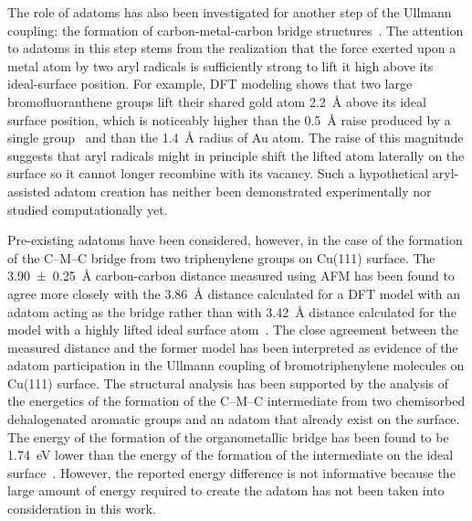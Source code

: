 \documentclass[aps,prb,reprint,amsmath,amssymb]{revtex4-1}
\newcommand{\lock}{\color{red}}
\newcommand{\lock}{\color{black}}
\begin{document}
{\lock 

The role of adatoms has also been investigated for another step of the Ullmann coupling: the formation of carbon-metal-carbon bridge structures~\cite{acsnano2017, acsnano2019}. 
The attention to adatoms in this step stems from the realization that the force exerted upon a metal atom by two aryl radicals is sufficiently strong to lift it high above its ideal-surface position. 
For example, DFT modeling shows that two large bromofluoranthene groups lift their shared gold atom \SI{2.2}{\angstrom} above its ideal surface position, which is noticeably higher than the \SI{0.5}{\angstrom} raise produced by a single group~\cite{jpcc2018} and than the \SI{1.4}{\angstrom} radius of Au atom.
The raise of this magnitude suggests that aryl radicals might in principle shift the lifted atom laterally on the surface so it cannot longer recombine with its vacancy. Such a hypothetical aryl-assisted adatom creation has neither been demonstrated experimentally nor studied computationally yet.

Pre-existing adatoms have been considered, however, in the case of the formation of the C--M--C bridge from two triphenylene groups on Cu(111) surface. 
The \SI{3.90\pm 0.25}{\angstrom} carbon-carbon distance measured using AFM has been found to agree more closely with the \SI{3.86}{\angstrom} distance calculated for a DFT model with an adatom acting as the bridge rather than with \SI{3.42}{\angstrom} distance calculated for the model with a highly lifted ideal surface atom~\cite{acsnano2017}. 
The close agreement between the measured distance and the former model has been interpreted as evidence of the adatom participation in the Ullmann coupling of bromotriphenylene molecules on Cu(111) surface. 
%
The structural analysis has been supported by the analysis of the energetics of the formation of the C--M--C intermediate from two chemisorbed dehalogenated aromatic groups and an adatom that already exist on the surface. The energy of the formation of the organometallic bridge has been found to be \SI{1.74}{\electronvolt} lower than the energy of the formation of the intermediate on the ideal surface~\cite{acsnano2017}. However, the reported energy difference is not informative because the large amount of energy required to create the adatom has not been taken into consideration in this work.

}
\end{document}
